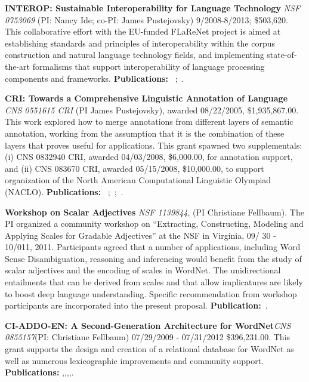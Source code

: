 \documentclass[10pt]{article}
\newcommand{\miniskip}{\vspace*{1mm}}
\begin{document}
\noindent
{\bf INTEROP: Sustainable Interoperability for Language Technology} 
{\it NSF 0753069} (PI: Nancy Ide; co-PI: James Pustejovsky) 9/2008-8/2013; \$503,620.
This collaborative effort with the EU-funded FLaReNet project is aimed at establishing standards and principles of interoperability within the corpus construction and natural language technology fields, and implementing state-of-the-art formalisms that support interoperability of language processing components and frameworks.  {\bf Publications: }~\cite{idesuderman09};~\cite{ide-bunt:2010:LAW-IV}.

\noindent
{\bf CRI: Towards a Comprehensive Linguistic Annotation of Language} {\it CNS 0551615 CRI} (PI James Pustejovsky), awarded 08/22/2005, \$1,935,867.00. This work explored how to merge annotations from different layers of semantic annotation, working from the assumption that it is the combination of these layers that proves useful for applications. This grant spawned two supplementals: (i) CNS 0832940 CRI, awarded 04/03/2008, \$6,000.00, for annotation support, and (ii) CNS 083670 CRI, awarded 05/15/2008, \$10,000.00, to support organization of the North American Computational Linguistic Olympiad (NACLO). {\bf Publications: }~\cite{verhagen-stubbs-pustejovsky:2007:LAW};~\cite{verhagen-EtAl:2007:SemEval-2007};~\cite{verhagen-pustejovsky:2007:Interoperability}.

\noindent
{\bf Workshop on Scalar Adjectives}
{\it  NSF   1139844}, (PI Christiane Fellbaum).  The PI organized a community workshop on ``Extracting, Constructing, 
Modeling and Applying Scales for Gradable Adjectives'' at the NSF in Virginia, 09/ 30 - 10/011, 2011. Participants agreed that a number of applications, including  
Word Sense Disambiguation,  reasoning and inferencing would benefit 
from the study of scalar adjectives and the encoding of scales in WordNet. The
unidirectional entailments that can be derived from scales and that allow implicatures are
likely to boost deep language understanding. Specific recommendation from workshop participants 
are incorporated into the present proposal. {\bf Publication:}~\cite{sheinmanetal2013}.

\noindent
{\bf CI-ADDO-EN: A Second-Generation Architecture for WordNet}{\it CNS 0855157}(PI: Christiane Fellbaum) 07/29/2009 - 07/31/2012
\$396,231.00. This grant supports the design and creation of a relational database for WordNet as well as numerous lexicographic improvements 
and community support. {\bf Publications:} \cite{fellbaumvossen2012},\cite{fellbaumencyclopedia},\cite{fellbaumontology2010},\cite{chiarcosinpress},\cite{nikolova2012}.
\end{document}
